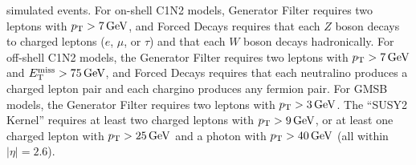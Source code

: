 \begin{sidewaystable}[tp]
{simulated events.
For on-shell C1N2 models, Generator Filter requires
two leptons with $\pt > 7\,\eV[G]$, and
Forced Decays requires
that each $Z$ boson decays to charged leptons ($e$, $\mu$, or $\tau$)
and that each $W$ boson decays hadronically.
For off-shell C1N2 models, the Generator Filter requires
two leptons with $\pt > 7\,\eV[G]$ and $\met > 75\,\eV[G]$, and
Forced Decays requires
that each neutralino produces a charged lepton pair and each chargino produces
any fermion pair.
For GMSB models, the Generator Filter requires
two leptons with $\pt > 3\,\eV[G]$.
The ``SUSY2 Kernel'' requires at least two charged leptons with
$\pt > 9\,\eV[G]$, or at least one charged lepton with
$\pt > 25\,\eV[G]$ and a photon with $\pt > 40\,\eV[G]$
(all within $|\eta|=2.6$).
}
\label{aux:ewk:cutflowSROffShell_2}
\end{sidewaystable}
